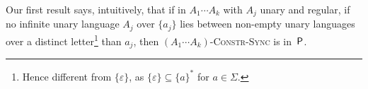  Our first result says, intuitively,  
 that if in $A_1 \cdots A_k$ with $A_j$ unary and regular,
 if no infinite unary language $A_j$ over $\{a_j\}$ lies %
 between 
 non-empty unary languages
 over a distinct letter\footnote{Hence different from $\{\varepsilon\}$, as $\{\varepsilon\} \subseteq \{a\}^*$
 for $a \in \Sigma$.}  than $a_j$, %
 then $(A_1 \cdots A_k)$\textsc{-Constr-Sync} is in~$\textsf{P}$.
 
 
